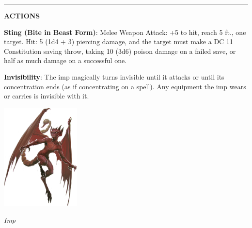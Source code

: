 \noindent\rule{0.5\textwidth}{0.5pt}

\noindent\textbf{ACTIONS}

\noindent\textbf{Sting (Bite in Beast Form)}: Melee Weapon Attack: +5 to hit, reach 5 ft., one target. Hit: 5 (1d4 + 3) piercing damage, and the target must make a DC 11 Constitution saving throw, taking 10 (3d6) poison damage on a failed save, or half as much damage on a successful one.

\noindent\textbf{Invisibility}: The imp magically turns invisible until it attacks or until its concentration ends (as if concentrating on a spell). Any equipment the imp wears or carries is invisible with it.

\begin{center}
	\includegraphics[width = 0.3\textwidth]{imp}
	
	\emph{Imp}
\end{center}